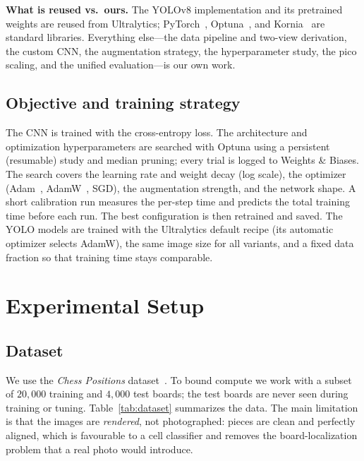 \documentclass[10pt,twocolumn,a4paper]{article}
\begin{document}
	\textbf{What is reused vs.\ ours.} The YOLOv8 implementation and its pretrained weights are reused from Ultralytics; PyTorch~\cite{paszke2019pytorch}, Optuna~\cite{akiba2019optuna}, and Kornia~\cite{riba2020kornia} are standard libraries. Everything else---the data pipeline and two-view derivation, the custom CNN, the augmentation strategy, the hyperparameter study, the pico scaling, and the unified evaluation---is our own work.

	\subsection{Objective and training strategy}

	The CNN is trained with the cross-entropy loss. The architecture and optimization hyperparameters are searched with Optuna using a persistent (resumable) study and median pruning; every trial is logged to Weights \& Biases. The search covers the learning rate and weight decay (log scale), the optimizer (Adam~\cite{kingma2015adam}, AdamW~\cite{loshchilov2019adamw}, SGD), the augmentation strength, and the network shape. A short calibration run measures the per-step time and predicts the total training time before each run. The best configuration is then retrained and saved. The YOLO models are trained with the Ultralytics default recipe (its automatic optimizer selects AdamW), the same image size for all variants, and a fixed data fraction so that training time stays comparable.

	\section{Experimental Setup}
	\label{sec:setup}

	\subsection{Dataset}

	We use the \textit{Chess Positions} dataset~\cite{koryakin2019chess}. To bound compute we work with a subset of $20{,}000$ training and $4{,}000$ test boards; the test boards are never seen during training or tuning. Table~\ref{tab:dataset} summarizes the data. The main limitation is that the images are \emph{rendered}, not photographed: pieces are clean and perfectly aligned, which is favourable to a cell classifier and removes the board-localization problem that a real photo would introduce.
\end{document}

